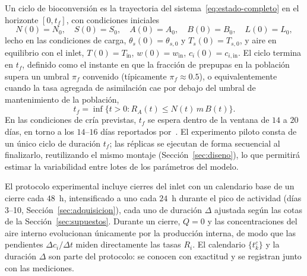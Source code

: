 \begin{definition}
\label{def33}
Un ciclo de bioconversi\'on es la trayectoria del sistema~\eqref{eq:estado-completo} en el horizonte $[0, t_f]$, con condiciones iniciales
\begin{equation}
N(0) = N_0, \quad S(0) = S_0, \quad A(0) = A_0, \quad B(0) = B_0, \quad L(0) = L_0,
\label{eq:cond-iniciales}
\end{equation}
lecho en las condiciones de carga, $\theta_s(0) = \theta_{s,0}$ y $T_s(0) = T_{s,0}$, y aire en equilibrio con el inlet, $T(0) = T_{\mathrm{in}}$, $w(0) = w_{\mathrm{in}}$, $c_i(0) = c_{i,\mathrm{in}}$. El ciclo termina en $t_f$, definido como el instante en que la fracci\'on de prepupas en la poblaci\'on supera un umbral $\pi_f$ convenido (t\'ipicamente $\pi_f \approx 0.5$), o equivalentemente cuando la tasa agregada de asimilaci\'on cae por debajo del umbral de mantenimiento de la poblaci\'on,
\begin{equation}
t_f = \inf\{ t > 0 : R_A(t) \le N(t)\,m\,B(t) \}.
\label{eq:tf}
\end{equation}
En las condiciones de cr\'ia previstas, $t_f$ se espera dentro de la ventana de $14$ a $20$ d\'ias, en torno a los $14$--$16$ d\'ias reportados por~\citep{eriksenDynamicModellingFeed2022}. El experimento piloto consta de un único ciclo de duración $t_f$; las réplicas se ejecutan de forma secuencial al finalizarlo, reutilizando el mismo montaje (Sección~\ref{sec:diseno}), lo que permitirá estimar la variabilidad entre lotes de los parámetros del modelo.
\end{definition}

\begin{remark}
\label{rem:cierres}
El protocolo experimental incluye cierres del inlet con un calendario base de un cierre cada $48$~h, intensificado a uno cada $24$~h durante el pico de actividad (d\'ias 3--10, Secci\'on~\ref{sec:adquisicion}), cada uno de duraci\'on $\Delta$ ajustada seg\'un las cotas de la Secci\'on~\ref{sec:supuestos}. Durante un cierre, $Q = 0$ y las concentraciones del aire interno evolucionan \'unicamente por la producci\'on interna, de modo que las pendientes $\Delta c_i / \Delta t$ miden directamente las tasas $R_i$. El calendario $\{t_k^c\}$ y la duraci\'on $\Delta$ son parte del protocolo: se conocen con exactitud y se registran junto con las mediciones.
\end{remark}

